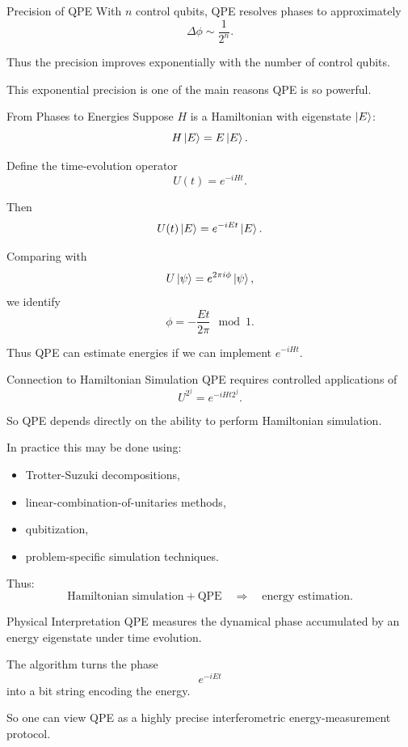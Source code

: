 \documentclass{beamer}
\begin{document}
\begin{frame}{Precision of QPE}
With \(n\) control qubits, QPE resolves phases to approximately
\[
\Delta \phi \sim \frac{1}{2^n}.
\]

Thus the precision improves exponentially with the number of control qubits.

This exponential precision is one of the main reasons QPE is so powerful.
\end{frame}

\begin{frame}{From Phases to Energies}
Suppose \(H\) is a Hamiltonian with eigenstate \(\ket{E}\):
\[
H\ket{E} = E\ket{E}.
\]

Define the time-evolution operator
\[
U(t)=e^{-iHt}.
\]

Then
\[
U(t)\ket{E} = e^{-iEt}\ket{E}.
\]

Comparing with
\[
U\ket{\psi}=e^{2\pi i \phi}\ket{\psi},
\]
we identify
\[
\phi = -\frac{Et}{2\pi} \mod 1.
\]

Thus QPE can estimate energies if we can implement \(e^{-iHt}\).
\end{frame}

\begin{frame}{Connection to Hamiltonian Simulation}
QPE requires controlled applications of
\[
U^{2^j} = e^{-iH t 2^j}.
\]

So QPE depends directly on the ability to perform Hamiltonian simulation.

In practice this may be done using:
\begin{itemize}
\item Trotter-Suzuki decompositions,
\item linear-combination-of-unitaries methods,
\item qubitization,
\item problem-specific simulation techniques.
\end{itemize}

Thus:
\[
\text{Hamiltonian simulation} + \text{QPE}
\quad \Rightarrow \quad
\text{energy estimation}.
\]
\end{frame}

\begin{frame}{Physical Interpretation}
QPE measures the dynamical phase accumulated by an energy eigenstate under time evolution.

The algorithm turns the phase
\[
e^{-iEt}
\]
into a bit string encoding the energy.

So one can view QPE as a highly precise interferometric energy-measurement protocol.
\end{frame}
\end{document}
